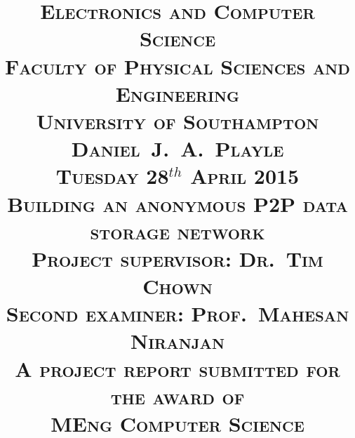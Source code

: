\clearpage
\title{ 
	\vspace{-1.0cm}
	\large{
		\textsc{Electronics and Computer Science}\\
		\textsc{Faculty of Physical Sciences and Engineering}\\
		\textsc{University of Southampton}\\
	}
	\large{
		\vspace{2.5cm}
		\textsc{Daniel~J.~A.~Playle}\\
		\vspace{1.0cm}
		\textsc{Tuesday 28$^{th}$ April 2015}\\
	}
		\vspace{2.5cm}
	\LARGE{
		\textsc{
			Building an anonymous P2P data storage network\\
		}
	}
	\large{
		\vspace{3.5cm}
		\textsc{Project supervisor: Dr.~Tim Chown}\\
		\textsc{Second examiner: Prof.~Mahesan Niranjan}\\
		\vspace{1.5cm}
		\textsc{A project report submitted for the award of}\\
		\textsc{MEng Computer Science\vspace{-3.0cm}}}
	}
\author{}
\date{}
\maketitle
\thispagestyle{empty}
\restoregeometry